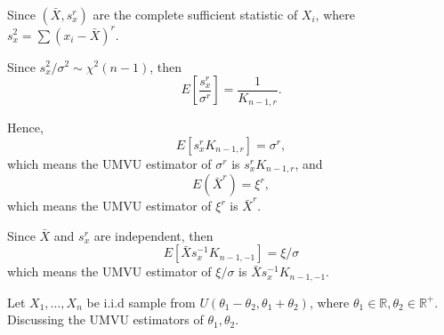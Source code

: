 \begin{solution}
\begin{enumerate}
        Since $(\bar{X},s_x^r)$ are the complete sufficient statistic of $X_i$, where $s_x^2=\sum\left(x_{i}-\bar{X}\right)^r$.

        Since $s_x^2/\sigma^2\sim\chi^2(n-1)$, then
        \begin{equation*}
            E\left[\frac{s_x^r}{\sigma^r}\right]=\frac{1}{K_{n-1,r}}.
        \end{equation*}

        Hence,
        \begin{equation*}
            E\left[s_x^rK_{n-1,r}\right]=\sigma^r,
        \end{equation*}
        which means the UMVU estimator of $\sigma^r$ is $s_x^rK_{n-1,r}$,
        and
        \begin{equation*}
            E(\bar{X}^r)=\xi^r,
        \end{equation*}
        which means the UMVU estimator of $\xi^r$ is $\bar{X}^r$.

        Since $\bar{X}$ and $s_x^r$ are independent, then
        \begin{equation*}
            E[\bar{X}s_x^{-1}K_{n-1,-1}]=\xi/\sigma
        \end{equation*}
        which means the UMVU estimator of $\xi/\sigma$ is $\bar{X}s_x^{-1}K_{n-1,-1}$.
    \end{enumerate}
\end{solution}

\begin{example}[]
    Let $X_{1},\ldots,X_{n}$ be i.i.d sample from $U\left(\theta_1-\theta_2,\theta_1+\theta_2\right)$, where $\theta_1\in\mathbb{R},\theta_2\in\mathbb{R}^+$. Discussing the UMVU estimators of $\theta_1,\theta_2$.
\end{example}


